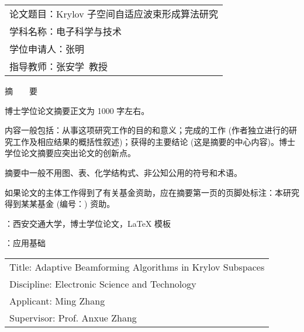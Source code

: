 
\setcounter{page}{1}

\begin{table}[!ht]\xiaosi\hei\vskip-1.5mm
	\begin{tabular}{@{}l}
		论文题目：Krylov 子空间自适应波束形成算法研究 \\
		学科名称：电子科学与技术 \\
		学位申请人：张明 \\
		指导教师：张安学~教授
	\end{tabular}
\end{table}

\noindent\parbox[c][15mm][c]{\textwidth}{\centering\sanhao 摘~~~~要}

博士学位论文摘要正文为 1000 字左右。

内容一般包括：从事这项研究工作的目的和意义；完成的工作 (作者独立进行的研究工作及相应结果的概括性叙述)；获得的主要结论 (这是摘要的中心内容)。博士学位论文摘要应突出论文的创新点。

摘要中一般不用图、表、化学结构式、非公知公用的符号和术语。

如果论文的主体工作得到了有关基金资助，应在摘要第一页的页脚处标注：本研究得到某某基金 (编号：) 资助。

\vspace{\baselineskip}
{ \hangindent=50.7pt
	：西安交通大学，博士学位论文，\LaTeX{} 模板
	
	\vspace{\baselineskip}
	：应用基础
}

\clearpage


\begin{table}[!ht]\fontsize{11.5pt}{11.5pt}\selectfont\bfseries\vskip-3mm
	\begin{tabular}{@{}l}
		Title: Adaptive Beamforming Algorithms in Krylov Subspaces \\
		Discipline: Electronic Science and Technology \\
		Applicant: Ming Zhang \\
		Supervisor: Prof. Anxue Zhang
	\end{tabular}
\end{table}

